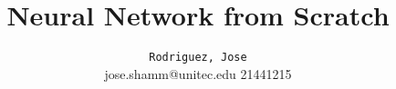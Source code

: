 \title{Neural Network from Scratch}
\author{
	\texttt{Rodriguez, Jose\\}
	jose.shamm@unitec.edu 21441215
}

\maketitle
